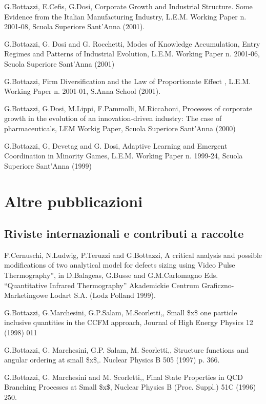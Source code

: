 \documentclass[a4paper]{article}
\begin{document}
G.Bottazzi, E.Cefis, G.Dosi, Corporate Growth and Industrial
Structure. Some Evidence from the Italian Manufacturing Industry,
L.E.M. Working Paper n. 2001-08, Scuola Superiore Sant'Anna (2001).

G.Bottazzi, G. Dosi and G. Rocchetti, Modes of Knowledge Accumulation,
Entry Regimes and Patterns of Industrial Evolution, L.E.M. Working
Paper n. 2001-06, Scuola Superiore Sant'Anna (2001)

G.Bottazzi, Firm Diversification and the Law of
Proportionate Effect , L.E.M. Working Paper n. 2001-01, S.Anna
School (2001).

G.Bottazzi, G.Dosi, M.Lippi, F.Pammolli, M.Riccaboni, Processes of
corporate growth in the evolution of an innovation-driven industry:
The case of pharmaceuticals, LEM Workig Paper, Scuola Superiore
Sant'Anna (2000)

G.Bottazzi, G, Devetag and G. Dosi, Adaptive Learning and Emergent
Coordination in Minority Games, L.E.M. Working Paper n.  1999-24,
Scuola Superiore Sant'Anna (1999)


\section{Altre pubblicazioni%
  \label{altre-pubblicazioni}%
}


\subsection{Riviste internazionali e contributi a raccolte%
  \label{riviste-internazionali-e-contributi-a-raccolte}%
}

F.Cernuschi, N.Ludwig, P.Teruzzi and G.Bottazzi, A critical analysis
and possible modifications of two analytical model for defects sizing
using Video Pulse Thermography'', in D.Balageas, G.Busse and
G.M.Carlomagno Eds. ``Quantitative Infrared Thermography'' Akademickie
Centrum Graficzno-Marketingowe Lodart S.A. (Lodz Polland 1999).

G.Bottazzi, G.Marchesini, G.P.Salam, M.Scorletti,, Small \$x\$ one
particle inclusive quantities in the CCFM approach, Journal of High
Energy Physics 12 (1998) 011

G.Bottazzi, G. Marchesini, G.P. Salam, M. Scorletti,, Structure
functions and angular ordering at small \$x\$,.  Nuclear Physics B 505
(1997) p. 366.

G.Bottazzi, G. Marchesini and M. Scorletti,, Final State Properties in
QCD Branching Processes at Small \$x\$, Nuclear Physics B (Proc. Suppl.)
51C (1996) 250.
\end{document}
